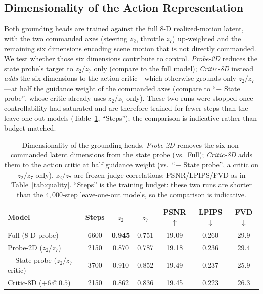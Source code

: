 \documentclass[letterpaper]{article} %
\begin{document}
\subsection{Dimensionality of the Action Representation}
Both grounding heads are trained against the full $8$-D realized-motion latent, with the two commanded axes (steering $z_2$, throttle $z_7$) up-weighted and the remaining six dimensions encoding scene motion that is not directly commanded. We test whether those six dimensions contribute to control. \emph{Probe-2D} reduces the state probe's target to $z_2/z_7$ only (compare to the full model); \emph{Critic-8D} instead \emph{adds} the six dimensions to the action critic---which otherwise grounds only $z_2/z_7$---at half the guidance weight of the commanded axes (compare to ``$-$ State probe'', whose critic already uses $z_2/z_7$ only). These two runs were stopped once controllability had saturated and are therefore trained for fewer steps than the leave-one-out models (Table~\ref{tab:dims}, ``Steps''); the comparison is indicative rather than budget-matched.

\begin{table}[t]
\centering
\setlength{\tabcolsep}{4pt}
\begin{tabular}{lcccccc}
\toprule
Model & Steps & $z_2$ & $z_7$ & PSNR$\uparrow$ & LPIPS$\downarrow$ & FVD$\downarrow$ \\
\midrule
Full ($8$-D probe)            & 6600 & \textbf{0.945} & 0.751 & 19.09 & 0.260 & 29.9 \\
\quad Probe-2D ($z_2/z_7$)    & 2150 & 0.870 & 0.787 & 19.18 & 0.236 & 29.4 \\
$-$ State probe ($z_2/z_7$ critic) & 3700 & 0.910 & 0.852 & 19.49 & 0.237 & 25.9 \\
\quad Critic-8D ($+6$\,@\,$0.5$)  & 2150 & 0.862 & 0.836 & 19.45 & 0.223 & 26.3 \\
\bottomrule
\end{tabular}
\caption{Dimensionality of the grounding heads. \emph{Probe-2D} removes the six non-commanded latent dimensions from the state probe (vs.\ Full); \emph{Critic-8D} adds them to the action critic at half guidance weight (vs.\ ``$-$ State probe'', a critic on $z_2/z_7$ only). $z_2/z_7$ are frozen-judge correlations; PSNR/LPIPS/FVD as in Table~\ref{tab:quality}. ``Steps'' is the training budget: these two runs are shorter than the $4{,}000$-step leave-one-out models, so the comparison is indicative.}
\label{tab:dims}
\end{table}
\end{document}
